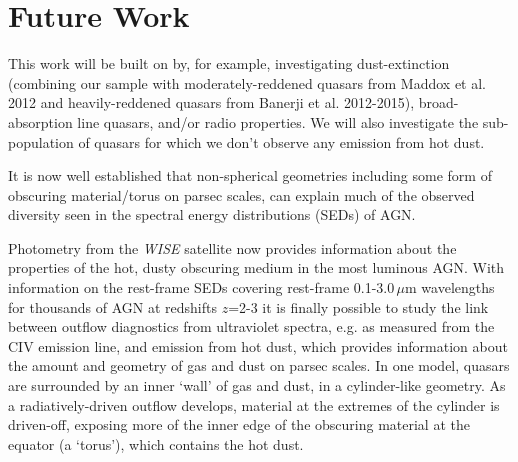 \section{Future Work}

This work will be built on by, for example, investigating dust-extinction (combining our sample with moderately-reddened quasars from Maddox et al. 2012 and heavily-reddened quasars from Banerji et al. 2012-2015), broad-absorption line quasars, and/or radio properties. We will also investigate the sub-population of quasars for which we don't observe any emission from hot dust. 









It is now well established that non-spherical geometries including some form of obscuring material/torus on parsec scales, can explain much of the observed diversity seen in the spectral energy distributions (SEDs) of AGN. 

Photometry from the \textit{WISE} satellite now provides information about the properties of the hot, dusty obscuring medium in the most luminous AGN. 
With information on the rest-frame SEDs covering rest-frame 0.1-3.0\,$\mu$m wavelengths for thousands of AGN
at redshifts $z$=2-3 it is finally possible to study the link between outflow diagnostics from ultraviolet spectra, e.g. as measured from the CIV emission line, and emission from hot dust, which provides information about the amount and geometry of gas and dust on parsec scales. 
In one model, quasars are surrounded by an inner `wall' of gas and dust, in a cylinder-like geometry. 
As a radiatively-driven outflow develops, material at the extremes of the cylinder is driven-off, exposing more of the inner edge of the obscuring material at the equator (a `torus'), which contains the hot dust. 


